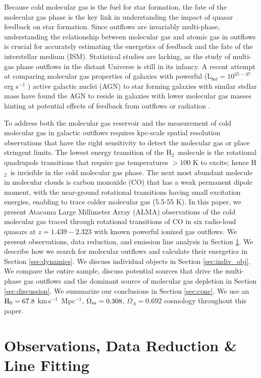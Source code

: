 \documentclass[twocolumn]{aastex63}
\newcommand{\kms}{km\,s$^{-1}$}
\newcommand{\ergs}{erg s$^{-1}$ }
\newcommand{\htwo}{H$_{2}$}
\begin{document}
Because cold molecular gas is the fuel for star formation, the fate of the molecular gas phase is the key link in understanding the impact of quasar feedback on star formation. Since outflows are invariably multi-phase, understanding the relationship between molecular gas and atomic gas in outflows is crucial for accurately estimating the energetics of feedback and the fate of the interstellar medium (ISM). Statistical studies are lacking, as the study of multi-gas phase outflows in the distant Universe is still in its infancy. A recent attempt at comparing molecular gas properties of galaxies with powerful (L$_{bol}=10^{45-47}$ \ergs) active galactic nuclei (AGN) to star forming galaxies with similar stellar mass have found the AGN to reside in galaxies with lower molecular gas masses hinting at potential effects of feedback from outflows or radiation \citep{Circosta21,Bischetti21}.

To address both the molecular gas reservoir and the measurement of cold molecular gas in galactic outflows requires kpc-scale spatial resolution observations that have the right sensitivity to detect the molecular gas or place stringent limits. The lowest energy transition of the \htwo\ molecule is the rotational quadrupole transitions that require gas temperatures $>100$ K to excite; hence \htwo\ is invisible in the cold molecular gas phase. The next most abundant molecule in molecular clouds is carbon monoxide (CO) that has a weak permanent dipole moment, with the near-ground rotational transitions having small excitation energies, enabling to trace colder molecular gas (5.5-55 K). In this paper, we present Atacama Large Millimeter Array (ALMA) observations of the cold molecular gas traced through rotational transitions of CO in six radio-loud quasars at $z=1.439-2.323$ with known powerful ionized gas outflows. We present observations, data reduction, and emission line analysis in Section \ref{sec:obs}. We describe how we search for molecular outflows and calculate their energetics in Section \ref{sec:dynamics}. We discuss individual objects in Section \ref{sec:indiv_obj}. We compare the entire sample, discuss potential sources that drive the multi-phase gas outflows and the dominant source of molecular gas depletion in Section \ref{sec:discussion}. We summarize our conclusions in Section \ref{sec:conc}. We use an $\rm H_{0}=67.8$ \kms\ Mpc$^{-1}$, $\Omega_{\rm m}=0.308$, $\Omega_{\Lambda}=0.692$ cosmology throughout this paper. 

\section{Observations, Data Reduction \& Line Fitting} \label{sec:obs}
\end{document}

